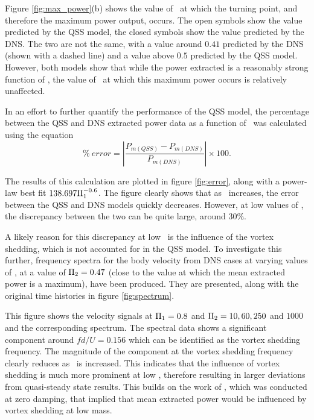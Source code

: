 Figure \ref{fig:max_power}(b) shows the value of \massdamp\ at which the turning point, and therefore the maximum power output, occurs. The open symbols show the value predicted by the QSS model, the closed symbols show the value predicted by the DNS. The two are not the same, with a value around $0.41$ predicted by the DNS (shown with a dashed line) and a value above $0.5$ predicted by the QSS model. However, both models show that while the power extracted is a reasonably strong function of \massstiff, the value of \massdamp\ at which this maximum power occurs is relatively unaffected.


In an effort to further quantify the performance of the QSS model, the percentage between the QSS and DNS extracted power data as a function of \massstiff\ was calculated using the equation
\begin{equation}   \label{eqn:error_calculation} 
\% \ error=\left|{\frac{P_{m(QSS)} - P_{m(DNS)}}{P_{m(DNS)}}}\right| \times 100.
\end{equation}

The results of this calculation are plotted in figure \ref{fig:error}, along with a power-law best fit $138.697\Pi_1^{-0.6}$. The figure clearly shows that as \massstiff \ increases, the error between the QSS and DNS models quickly decreases. However, at low values of \massstiff, the discrepancy between the two can be quite large, around $30\%$.



A likely reason for this discrepancy at low \massstiff\ is the influence of the vortex shedding, which is not accounted for in the QSS model. To investigate this further, frequency spectra for the body velocity from DNS cases at varying values of \massstiff, at a value of $\Pi_2=0.47$ (close to the value at which the mean extracted power is a maximum), have been produced. They are presented, along with the original time histories in figure \ref{fig:spectrum}.



This figure shows the  velocity signals at $\Pi_1=0.8$ and $\Pi_2= 10, 60, 250$ and $1000$ and the corresponding spectrum. The spectral data shows a significant component around $fd/U=0.156$ which can be identified as the vortex shedding frequency. The magnitude of the component at the vortex shedding frequency clearly reduces as \massstiff\ is increased. This indicates that the influence of vortex shedding is much more prominent at low \massstiff,  therefore resulting in larger deviations from quasi-steady state results. This builds on the work of \cite{Joly2012}, which was conducted at zero damping, that implied that mean extracted power would be influenced by vortex shedding at low mass.

